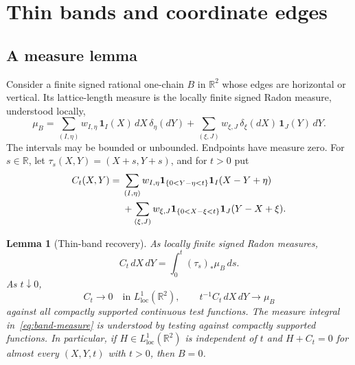 \documentclass[11pt]{article}
\newtheorem{lemma}[theorem]{Lemma}
\theoremstyle{definition}
\theoremstyle{remark}
\newcommand{\R}{\mathbb R}
\newcommand{\ind}{\mathbf 1}
\begin{document}
\section{Thin bands and coordinate edges}

\subsection{A measure lemma}

Consider a finite signed rational one-chain $B$ in $\R^2$ whose edges
are horizontal or vertical. Its lattice-length measure is the locally
finite signed Radon measure, understood locally,
\begin{equation}\label{eq:source-measure}
 \mu_B=
 \sum_{(I,\eta)}w_{I,\eta}\,\ind_I(X)\,dX\,\delta_\eta(dY)
 +\sum_{(\xi,J)}w_{\xi,J}\,\delta_\xi(dX)\,\ind_J(Y)\,dY.
\end{equation}
The intervals may be bounded or unbounded. Endpoints have measure zero.
For $s\in\R$, let $\tau_s(X,Y)=(X+s,Y+s)$, and for $t>0$ put
\begin{align}
 C_t(X,Y)={}&
 \sum_{(I,\eta)}w_{I,\eta}
       \ind_{\{0<Y-\eta<t\}}\ind_I(X-Y+\eta)\notag\\
 &+\sum_{(\xi,J)}w_{\xi,J}
       \ind_{\{0<X-\xi<t\}}\ind_J(Y-X+\xi).
 \label{eq:central-density}
\end{align}

\begin{lemma}[Thin-band recovery]\label{lem:thin-band}
As locally finite signed Radon measures,
\begin{equation}\label{eq:band-measure}
 C_t\,dX\,dY=\int_0^t(\tau_s)_*\mu_B\,ds.
\end{equation}
As $t\downarrow0$,
\begin{equation}\label{eq:band-limits}
 C_t\longrightarrow0\quad\text{in }L^1_{\mathrm{loc}}(\R^2),
 \qquad
 t^{-1}C_t\,dX\,dY\longrightarrow\mu_B
\end{equation}
against all compactly supported continuous test functions.
The measure integral in~\eqref{eq:band-measure} is understood by
testing against compactly supported functions.
In particular, if $H\in L^1_{\mathrm{loc}}(\R^2)$ is independent of
$t$ and $H+C_t=0$ for almost every $(X,Y,t)$ with $t>0$, then $B=0$.
\end{lemma}
\end{document}

